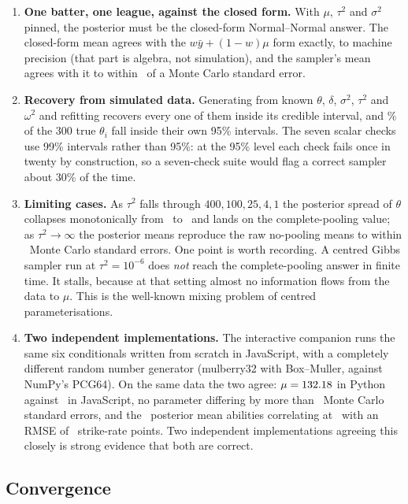 \documentclass[11pt,a4paper]{article}
\begin{document}
\begin{enumerate}
\item \textbf{One batter, one league, against the closed form.} With $\mu$, $\tau^2$ and
$\sigma^2$ pinned, the posterior must be the closed-form Normal--Normal answer. The
closed-form mean agrees with the $w\bar y + (1-w)\mu$ form exactly, to machine precision (that
part is algebra, not simulation), and the sampler's mean agrees with it to within
\ntestOneMcse\ of a Monte Carlo standard error.
\item \textbf{Recovery from simulated data.} Generating from known $\theta$, $\delta$,
$\sigma^2$, $\tau^2$ and $\omega^2$ and refitting recovers every one of them inside its
credible interval, and \ntestTwoCoverage\% of the 300 true $\theta_i$ fall inside their own 95\%
intervals. The seven scalar checks use 99\% intervals rather than 95\%: at the 95\% level each
check fails once in twenty by construction, so a seven-check suite would flag a correct sampler
about 30\% of the time.
\item \textbf{Limiting cases.} As $\tau^2$ falls through $400, 100, 25, 4, 1$ the
posterior spread of $\theta$ collapses monotonically from \ntestThreeSpreadFirst\ to
\ntestThreeSpreadLast\ and lands on the complete-pooling value; as $\tau^2 \to \infty$ the
posterior means reproduce the raw no-pooling means to within \ntestThreeMaxZ\ Monte Carlo
standard errors. One point is worth recording. A
centred Gibbs sampler run at $\tau^2 = 10^{-6}$ does \emph{not} reach the complete-pooling
answer in finite time. It stalls, because at that setting almost no information flows from the
data to $\mu$. This is the well-known mixing problem of centred parameterisations.
\item \textbf{Two independent implementations.} The interactive companion runs the same six
conditionals written from scratch in JavaScript, with a completely different random number
generator (mulberry32 with Box--Muller, against NumPy's PCG64). On the same data the two agree:
$\mu = 132.18$ in Python against \njsMu\ in JavaScript, no parameter differing by more than
\njsMaxZ\ Monte Carlo standard errors, and the \nNplayers\ posterior mean abilities correlating
at \njsThetaCorr\ with an RMSE of \njsThetaRmse\ strike-rate points. Two independent
implementations agreeing this closely is strong evidence that both are correct.
\end{enumerate}

\subsection{Convergence}
\end{document}
